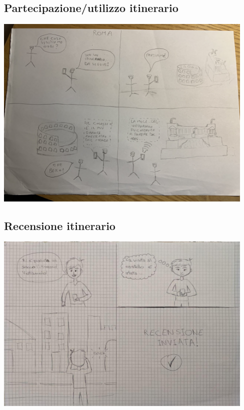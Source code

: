 \centering \subsection{Partecipazione/utilizzo itinerario}

\begin{center}
    \includegraphics[width=12.5cm]{../storyboards/Utilizzo.jpg}
\end{center}

\centering \subsection{Recensione itinerario}

\begin{center}
    \includegraphics[width=12.5cm]{../storyboards/Recensione.jpg}
\end{center}

\raggedright